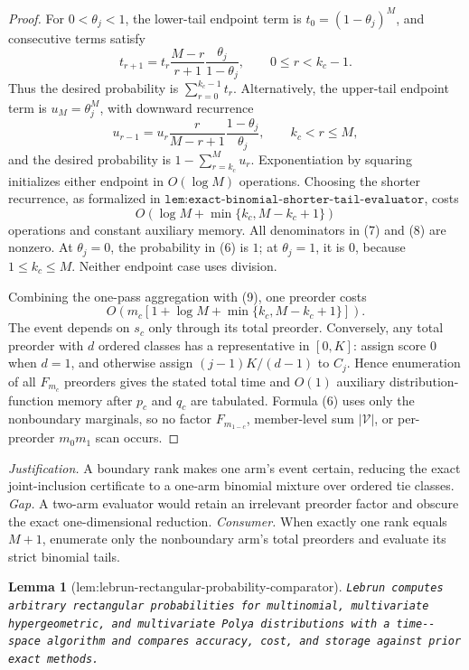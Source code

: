 \documentclass{article}
\newtheorem{lemma}{Lemma}
\begin{document}
\begin{proof}
For \(0<\theta_j<1\), the lower-tail endpoint term is \(t_0=(1-\theta_j)^M\), and consecutive terms satisfy
\[
t_{r+1}=t_r\frac{M-r}{r+1}\frac{\theta_j}{1-\theta_j},\qquad 0\le r<k_c-1.
\tag{7}
\]
Thus the desired probability is \(\sum_{r=0}^{k_c-1}t_r\). Alternatively, the upper-tail endpoint term is \(u_M=\theta_j^M\), with downward recurrence
\[
u_{r-1}=u_r\frac{r}{M-r+1}\frac{1-\theta_j}{\theta_j},\qquad k_c<r\le M,
\tag{8}
\]
and the desired probability is \(1-\sum_{r=k_c}^M u_r\). Exponentiation by squaring initializes either endpoint in \(O(\log M)\) operations. Choosing the shorter recurrence, as formalized in \(\texttt{lem:exact-binomial-shorter-tail-evaluator}\), costs
\[
O\!\left(\log M+\min\{k_c,M-k_c+1\}\right)
\tag{9}
\]
operations and constant auxiliary memory. All denominators in (7) and (8) are nonzero. At \(\theta_j=0\), the probability in (6) is \(1\); at \(\theta_j=1\), it is \(0\), because \(1\le k_c\le M\). Neither endpoint case uses division.

Combining the one-pass aggregation with (9), one preorder costs
\[
O\!\left(m_c\left[1+\log M+\min\{k_c,M-k_c+1\}\right]\right).
\tag{10}
\]
The event depends on \(s_c\) only through its total preorder. Conversely, any total preorder with \(d\) ordered classes has a representative in \([0,K]\): assign score \(0\) when \(d=1\), and otherwise assign \((j-1)K/(d-1)\) to \(C_j\). Hence enumeration of all \(F_{m_c}\) preorders gives the stated total time and \(O(1)\) auxiliary distribution-function memory after \(p_c\) and \(q_c\) are tabulated. Formula (6) uses only the nonboundary marginals, so no factor \(F_{m_{1-c}}\), member-level sum \(|\mathcal V|\), or per-preorder \(m_0m_1\) scan occurs.
\end{proof}
\par\smallskip\noindent \textit{Justification.} A boundary rank makes one arm's event certain, reducing the exact joint-inclusion certificate to a one-arm binomial mixture over ordered tie classes. \textit{Gap.} A two-arm evaluator would retain an irrelevant preorder factor and obscure the exact one-dimensional reduction. \textit{Consumer.} When exactly one rank equals \(M+1\), enumerate only the nonboundary arm's total preorders and evaluate its strict binomial tails.

\begin{lemma}[lem:lebrun-rectangular-probability-comparator]\label{lem:lebrun-rectangular-probability-comparator}
\texttt{Lebrun computes arbitrary rectangular probabilities for multinomial,\allowbreak{} multivariate hypergeometric,\allowbreak{} and multivariate Polya distributions with a time-\allowbreak{}-\allowbreak{}space algorithm and compares accuracy,\allowbreak{} cost,\allowbreak{} and storage against prior exact methods.}
\end{lemma}
\end{document}
